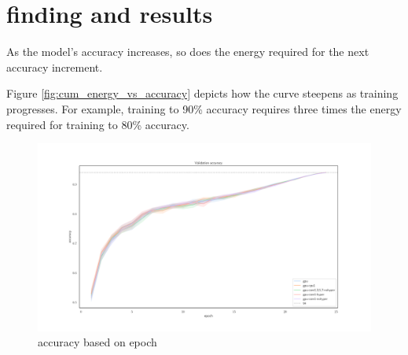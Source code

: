 \section{finding and results}
As the model's accuracy increases, so does the energy required for the next accuracy increment.

Figure \ref{fig:cum_energy_vs_accuracy} depicts how the curve steepens as training progresses.
For example, training to 90\% accuracy requires three times the energy required for training to 80\% accuracy.
\begin{figure}
    \centering
    \includegraphics[width=\linewidth]{imgs/accuracy_basedonepoch}
    \caption{accuracy based on epoch  }
    \label{fig:p2}
\end{figure}

